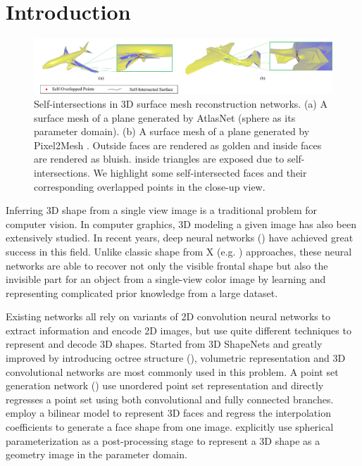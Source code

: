 \section{Introduction}
\begin{figure}[htbp]
	\centering
	\includegraphics[width=\linewidth]{img/issue/issue}
	\caption{Self-intersections in 3D surface mesh reconstruction networks. (a) A surface mesh of a plane generated by AtlasNet \cite{atlasnet} (sphere as its parameter domain). (b) A surface mesh of a plane generated by Pixel2Mesh \cite{pixel2mesh}. Outside faces are rendered as golden and inside faces are rendered as bluish.  inside triangles are exposed due to self-intersections. We highlight some self-intersected faces and their corresponding overlapped points in the close-up view.}
	\label{fig:issue}
\end{figure}
Inferring 3D shape from a single view image is a traditional problem for computer vision. In computer graphics, 3D modeling  a given image has also been extensively studied. In recent years, deep neural networks (\cite{3DR2N2,PSGN,3Drender,imgrecon15,3dshapenet,endface,octreegen,surfnet,shapeprior}) have achieved great success in this field. Unlike classic shape from X (e.g. \cite{shapefromshading,shapefromtext1,shapefromtext2}) approaches, these neural networks are able to recover not only the visible frontal shape but also the invisible part for an object from a single-view color image by learning and representing complicated prior knowledge from a large dataset. 

Existing networks all rely on variants of 2D convolution neural networks to extract information and encode 2D images, but use quite different techniques to represent and decode 3D shapes. Started from 3D ShapeNets \cite{3dshapenet} and greatly improved by introducing octree structure (\cite{octreegen}), volumetric representation and 3D convolutional networks are most commonly used in this problem. A point set generation network (\cite{PSGN}) use unordered point set representation and directly regresses a point set using both convolutional and fully connected branches. \cite{endface} employ a bilinear model to represent 3D faces and regress the interpolation coefficients to generate a face shape from one image. \cite{surfnet} explicitly use spherical parameterization as a post-processing stage to represent a 3D shape as a geometry image in the parameter domain. 

